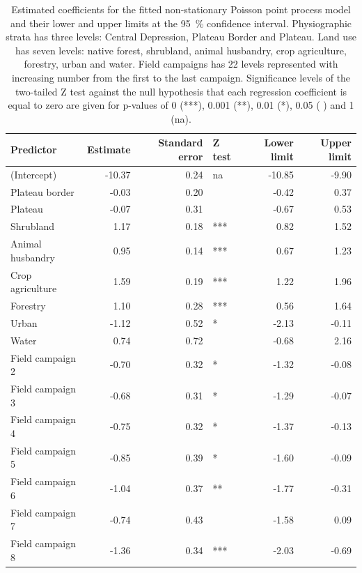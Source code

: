 \begin{table}[!ht]
 \caption{Estimated coefficients for the fitted non-stationary Poisson point process model and their lower and 
 upper limits at the \SI{95}{\percent} confidence interval. Physiographic strata has three levels: Central 
 Depression, Plateau Border and Plateau. Land use has seven levels: native forest, shrubland, animal 
 husbandry, crop agriculture, forestry, urban and water. Field campaigns has \num{22} levels represented with 
 increasing number from the first to the last campaign. Significance levels of the two-tailed Z test against 
the null 
 hypothesis that each regression coefficient is equal to zero are given for p-values of \num{0} (***), 
 \num{0.001} (**), \num{0.01} (*), \num{0.05} ( ) and \num{1} (na).}
 \label{tab:chap07-coef}
 \centering\footnotesize
 \begin{tabular}{lrrlrr}
  \hline
  Predictor		& Estimate 	& Standard error	& Z test & Lower limit 	& Upper limit	\\ 
  \hline
  (Intercept)		& -10.37 	& 0.24 			& na 	& -10.85	& -9.90         \\ 
  Plateau border	& -0.03 	& 0.20 			&    	& -0.42 	& 0.37	\\ 
  Plateau		& -0.07 	& 0.31 			&    	& -0.67 	& 0.53 	\\ 
  Shrubland		& 1.17 		& 0.18 			& *** 	& 0.82 	        & 1.52 	\\ 
  Animal husbandry	& 0.95 		& 0.14 			& *** 	& 0.67 		& 1.23 	\\ 
  Crop agriculture	& 1.59 		& 0.19 			& *** 	& 1.22 		& 1.96 	\\ 
  Forestry		& 1.10 		& 0.28 			& *** 	& 0.56 		& 1.64 	\\ 
  Urban			& -1.12 	& 0.52 			& * 	& -2.13 	& -0.11 \\ 
  Water			& 0.74 		& 0.72 			&    	& -0.68 	& 2.16 	\\ 
  Field campaign 2	& -0.70 	& 0.32 			& * 	& -1.32 	& -0.08\\ 
  Field campaign 3	& -0.68 	& 0.31 			& * 	& -1.29 	& -0.07\\ 
  Field campaign 4	& -0.75 	& 0.32 			& * 	& -1.37 	& -0.13\\ 
  Field campaign 5	& -0.85 	& 0.39 			& * 	& -1.60 	& -0.09 \\ 
  Field campaign 6	& -1.04 	& 0.37 			& **	& -1.77 	& -0.31 \\ 
  Field campaign 7	& -0.74 	& 0.43 			&    	& -1.58 	& 0.09 	\\ 
  Field campaign 8	& -1.36 	& 0.34 			& *** 	& -2.03 	& -0.69 \\ 

\end{tabular}
\end{table}
